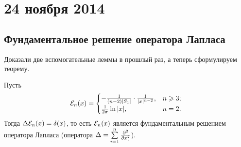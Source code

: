 \section{24 ноября 2014}
\subsection{Фундаментальное решение оператора Лапласа}
Доказали две вспомогательные леммы в прошлый раз, а теперь сформулируем теорему.
\begin{The}
  Пусть 
 \[
  \mathcal E_n(x) = \begin{cases}
  -\frac1{(n-2)|S_1|}\cdot\frac1{|x|^{n-2}},&n\geqslant 3;\\
  \frac1{2\pi}\ln|x|,&n=2.
\end{cases}
  \]
Тогда $\Delta\mathcal E_n(x) = \delta(x)$, то есть $\mathcal E_n(x)$  является фундаментальным решением оператора Лапласа (оператора $\Delta = \sum\limits_{i = 1}^{n}\frac{\partial ^2}{\partial x_i^2}$).
\end{The}

